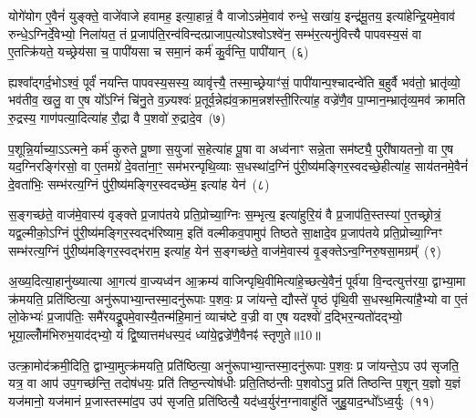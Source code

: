 योगे॑योग ए॒वैनं॑ युङ्क्ते॒ वाजे॑वाजे हवामह॒ इत्या॒हान्नं॒ वै वाजो\-ऽन्न॑मे॒वाव॑ रुन्धे॒ सखा॑य॒ इन्द्र॑मू॒तय॒ इत्या॑हेन्द्रि॒यमे॒वाव॑ रुन्धे॒\-ऽग्निर्दे॒वेभ्यो॒ निला॑यत॒ तं प्र॒जा\-प॑ति॒रन्व॑विन्दत्प्राजाप॒त्यो\-ऽश्वो\-ऽश्वे॑न॒ सम्भ॑र॒त्यनु॑वित्त्यै पापवस्य॒सं वा ए॒तत्क्रि॑यते॒ यच्छ्रेय॑सा च॒ पापी॑यसा च समा॒नं कर्म॑ कु॒र्वन्ति॒ पापी॑यान्~(६)

ह्यश्वा᳚द्गर्द॒भो\-ऽश्वं॒ पूर्वं॑ नयन्ति पापवस्य॒सस्य॒ व्यावृ॑त्त्यै॒ तस्मा॒च्छ्रेयाꣳ॑सं॒ पापी॑यान्प॒श्चादन्वे॑ति ब॒हुर्वै भव॑तो॒ भ्रातृ॑व्यो॒ भव॑तीव॒ खलु॒ वा ए॒ष यो᳚\-ऽग्निं चि॑नु॒ते व॒ज्र्यश्वः॑ प्र॒तूर्व॒न्नेह्य॑व॒क्राम॒न्नश॑स्ती॒रित्या॑ह॒ वज्रे॑णै॒व पा॒प्मान॒म्भ्रातृ॑व्य॒मव॑ क्रामति रु॒द्रस्य॒ गाण॑पत्या॒दित्या॑ह रौ॒द्रा वै प॒शवो॑ रु॒द्रादे॒व~(७)

प॒शून्नि॒र्याच्या॒\-ऽऽ\-त्मने॒ कर्म॑ कुरुते पू॒ष्णा स॒युजा॑ स॒हेत्या॑ह पू॒षा वा अध्व॑नाꣳ सन्ने॒ता सम॑ष्ट्यै॒ पुरी॑षायतनो॒ वा ए॒ष यद॒ग्निरङ्गि॑रसो॒ वा ए॒तमग्रे॑ दे॒वता॑ना॒ꣳ॒ सम॑भरन्पृथि॒व्याः स॒धस्था॑द॒ग्निं पु॑री॒ष्य॑मङ्गिर॒\-स्वदच्छे॒हीत्या॑ह॒ साय॑तनमे॒वैनं॑ दे॒वता॑भिः॒ सम्भ॑रत्य॒ग्निं पु॑री॒ष्य॑मङ्गिर॒\-स्वदच्छे॑म॒ इत्या॑ह येन॑~(८)

स॒ङ्गच्छ॑ते॒ वाज॑मे॒वास्य॑ वृङ्क्ते प्र॒जा\-प॑तये प्रति॒प्रोच्या॒ग्निः स॒म्भृत्य॒ इत्या॑हुरि॒यं वै प्र॒जा\-प॑ति॒स्तस्या॑ ए॒तच्छ्रोत्रं॒ यद्व॒ल्मीको॒\-ऽग्निं पु॑री॒ष्य॑मङ्गिर॒\-स्वद्भ॑रिष्याम॒ इति॑ वल्मीकव॒पामुप॑ तिष्ठते सा॒क्षादे॒व प्र॒जा\-प॑तये प्रति॒प्रोच्या॒ग्निꣳ सम्भ॑रत्य॒ग्निं पु॑री॒ष्य॑मङ्गिर॒\-स्वद्भ॑राम॒ इत्या॑ह॒ येन॑ स॒ङ्गच्छ॑ते॒ वाज॑मे॒वास्य॑ वृ॒ङ्क्ते\-ऽन्व॒ग्निरु॒षसा॒मग्रम्᳚~(९)

अ॒ख्य॒दित्या॒हानु॑ख्यात्या आ॒गत्य॑ वा॒ज्यध्व॑न आ॒क्रम्य॑ वाजिन्पृथि॒वीमित्या॑हे॒च्छत्ये॒वैनं॒ पूर्व॑या वि॒न्दत्युत्त॑रया॒ द्वाभ्या॒मा क्र॑मयति॒ प्रति॑ष्ठित्या॒ अनु॑रूपाभ्या॒न्तस्मा॒दनु॑रूपाः प॒शवः॒ प्र जा॑यन्ते॒ द्यौस्ते॑ पृ॒ष्ठं पृ॑थि॒वी स॒धस्थ॒मित्या॑है॒भ्यो वा ए॒तं लो॒केभ्यः॑ प्र॒जा\-प॑तिः॒ समै॑रयद्रू॒पमे॒वास्यै॒तन्म॑हि॒मानं॒ व्याच॑ष्टे व॒ज्री वा ए॒ष यदश्वो॑ द॒द्भिर॒न्यतो॑दद्भ्यो॒ भूया॒ल्लोँम॑भिरुभ॒याद॑द्भ्यो॒ यं द्वि॒ष्यात्तम॑धस्प॒दं ध्या॑ये॒द्वज्रे॑णै॒वैनꣴ॑ स्तृणुते॥10॥

{\anuvakamend[{आ॒ह॒ पापी॑यान्रु॒द्रादे॒व येनाग्रं॑ व॒ज्री वै स॒प्तद॑श च}]}%

उत्क्रा॒मोद॑क्रमी॒दिति॒ द्वाभ्या॒मुत्क्र॑मयति॒ प्रति॑ष्ठित्या॒ अनु॑रूपाभ्या॒न्तस्मा॒दनु॑रूपाः प॒शवः॒ प्र जा॑यन्ते॒\-ऽप उप॑ सृजति॒ यत्र॒ वा आप॑ उप॒गच्छ॑न्ति॒ तदोष॑धयः॒ प्रति॑ तिष्ठ॒न्त्योष॑धीः प्रति॒तिष्ठ॑न्तीः प॒शवो\-ऽनु॒ प्रति॑ तिष्ठन्ति प॒शून् य॒ज्ञो य॒ज्ञं यज॑मानो॒ यज॑मानं प्र॒जास्तस्मा॑द॒प उप॑ सृजति॒ प्रति॑ष्ठित्यै॒ यद॑ध्व॒र्युर॑न॒ग्नावाहु॑तिं जुहु॒याद॒न्धो᳚\-ऽध्व॒र्युः~(११)

